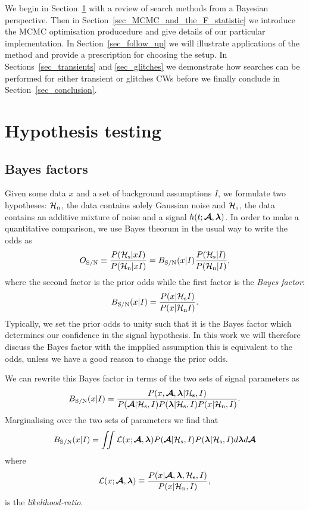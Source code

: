 \documentclass[aps, prd, twocolumn, superscriptaddress, floatfix, showpacs, nofootinbib, longbibliography]{revtex4-1}
\begin{document}
We begin in Section~\ref{sec_hypothesis_testing} with a review of search
methods from a Bayesian perspective. Then in
Section~\ref{sec_MCMC_and_the_F_statistic} we introduce the MCMC optimisation
producedure and give details of our particular implementation. In
Section~\ref{sec_follow_up} we will illustrate applications of the method and
provide a prescription for choosing the setup. In Sections~\ref{sec_transients}
and \ref{sec_glitches} we demonstrate how searches can be performed for either
transient or glitches CWs before we finally conclude in
Section~\ref{sec_conclusion}.

\section{Hypothesis testing}
\label{sec_hypothesis_testing}

\subsection{Bayes factors}
Given some data $x$ and a set of background assumptions $I$, we formulate
two hypotheses: $\mathcal{H}_{\rm n}$, the data contains solely Gaussian noise and $\mathcal{H}_{\rm s}$, the
data contains an additive mixture of noise and a signal $h(t; \boldsymbol{\mathcal{A}}, \boldsymbol{\mathbf{\lambda}})$.
In order to make a quantitative comparison, we use Bayes theorum in the usual
way to write the odds as
\begin{equation}
O_{\rm S/N} \equiv \frac{P(\mathcal{H}_{\rm s}| x I)}{P(\mathcal{H}_{\rm n}| x I)} =
B_{\rm S/N}(x| I) \frac{P(\mathcal{H}_{\rm s}| I)}{P(\mathcal{H}_{\rm n} | I)},
\end{equation}
where the second factor is the prior odds while the first factor is the
\emph{Bayes factor}:
\begin{equation}
B_{\rm S/N}(x| I) = \frac{P(x| \mathcal{H}_{\rm s} I)}{P(x| \mathcal{H}_{\rm n} I)}.
\end{equation}
Typically, we set the prior odds to unity such that it is the Bayes factor
which determines our confidence in the signal hypothesis. In this work we will
therefore discuss the Bayes factor with the impplied assumption this is
equivalent to the odds, unless we have a good reason to change the prior odds.

We can rewrite this Bayes factor in terms of the two sets of signal parameters
as
\begin{equation}
B_{\rm S/N}(x| I) = \frac{P(x, \boldsymbol{\mathcal{A}}, \boldsymbol{\mathbf{\lambda}}|\mathcal{H}_{\rm s}, I)}
{P(\boldsymbol{\mathcal{A}}| \mathcal{H}_{\rm s}, I)P(\boldsymbol{\mathbf{\lambda}}| \mathcal{H}_{\rm s}, I)P(x| \mathcal{H}_{\rm n}, I)}.
\end{equation}
Marginalising over the two sets of parameters we find that
\begin{equation}
B_{\rm S/N}(x| I)= \iint
\mathcal{L}(x; \boldsymbol{\mathcal{A}}, \boldsymbol{\mathbf{\lambda}})
P(\boldsymbol{\mathcal{A}}| \mathcal{H}_{\rm s}, I)P(\boldsymbol{\mathbf{\lambda}}| \mathcal{H}_{\rm s}, I)
d\boldsymbol{\mathbf{\lambda}} d\boldsymbol{\mathcal{A}}
\label{eqn_full_bayes}
\end{equation}
where
\begin{equation}
\mathcal{L}(x; \boldsymbol{\mathcal{A}}, \boldsymbol{\mathbf{\lambda}}) \equiv \frac{P(x |\boldsymbol{\mathcal{A}}, \boldsymbol{\mathbf{\lambda}}, \mathcal{H}_{\rm s}, I)}{P(x| \mathcal{H}_{\rm n}, I)},
\label{eqn_likelihood}
\end{equation}
is the \emph{likelihood-ratio}.
\end{document}

